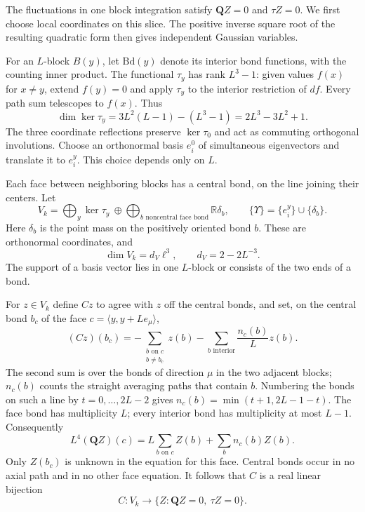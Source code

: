 \documentclass[11pt,letterpaper,reqno]{amsart}
\newcommand{\R}{\mathbb R}
\begin{document}
The fluctuations in one block integration satisfy
$\mathbf Q Z=0$ and $\tau Z=0$. We first choose local coordinates
on this slice. The positive inverse square root of the resulting
quadratic form then gives independent Gaussian variables.

For an $L$-block $B(y)$, let $\mathrm{Bd}(y)$ denote its interior
bond functions, with the counting inner product. The functional
$\tau_y$ has rank $L^3-1$: given values $f(x)$ for $x\ne y$, extend
$f(y)=0$ and apply $\tau_y$ to the interior restriction of $df$.
Every path sum telescopes to $f(x)$. Thus
\[
 \dim\ker\tau_y=3L^2(L-1)-(L^3-1)=2L^3-3L^2+1.
\]
The three coordinate reflections preserve $\ker\tau_0$ and act as
commuting orthogonal involutions. Choose an orthonormal basis
$e_i^0$ of simultaneous eigenvectors and translate it to $e_i^y$.
This choice depends only on $L$.

Each face between neighboring blocks has a central bond, on the
line joining their centers. Let
\[
 V_k=\bigoplus_y\ker\tau_y\ \oplus\!\!\!
       \bigoplus_{b\text{ noncentral face bond}}\R\delta_b,
 \qquad
 \{\Upsilon\}=\{e_i^y\}\cup\{\delta_b\}.
\]
Here $\delta_b$ is the point mass on the positively oriented bond
$b$. These are orthonormal coordinates, and
\begin{equation}\label{eq:photon-fluctuation-dimension}
 \dim V_k=d_V\ell^3,\qquad d_V=2-2L^{-3}.
\end{equation}
The support of a basis vector lies in one $L$-block or consists of
the two ends of a bond.

For $z\in V_k$ define $Cz$ to agree with $z$ off the central bonds,
and set, on the central bond $b_c$ of the face
$c=\langle y,y+Le_\mu\rangle$,
\begin{equation}\label{eq:photon-central-bond-elimination}
 (Cz)(b_c)=-\sum_{\substack{b\text{ on }c\\b\ne b_c}}z(b)
                -\sum_{b\text{ interior}}\frac{n_c(b)}Lz(b).
\end{equation}
The second sum is over the bonds of direction $\mu$ in the two
adjacent blocks; $n_c(b)$ counts the straight averaging paths that
contain $b$. Numbering the bonds on such a line by
$t=0,\ldots,2L-2$ gives
$n_c(b)=\min(t+1,2L-1-t)$. The face bond has multiplicity $L$;
every interior bond has multiplicity at most $L-1$. Consequently
\[
 L^4(\mathbf QZ)(c)=L\sum_{b\text{ on }c}Z(b)
                            +\sum_b n_c(b)Z(b).
\]
Only $Z(b_c)$ is unknown in the equation for this face. Central
bonds occur in no axial path and in no other face equation.
It follows that $C$ is a real linear bijection
\begin{equation}\label{eq:photon-coordinate-bijection}
 C:V_k\longrightarrow
       \{Z:\mathbf QZ=0,\ \tau Z=0\}.
\end{equation}
\end{document}
